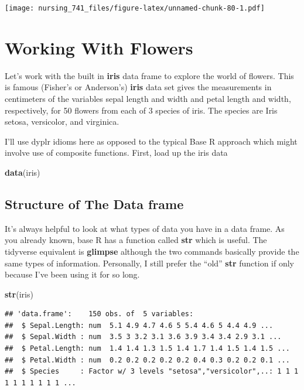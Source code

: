 \documentclass[]{book}
\newenvironment{Shaded}{\begin{snugshade}}{\end{snugshade}}
\newcommand{\KeywordTok}[1]{\textcolor[rgb]{0.13,0.29,0.53}{\textbf{#1}}}
\newcommand{\NormalTok}[1]{#1}
\begin{document}
\texttt{[image: nursing\_741\_files/figure-latex/unnamed-chunk-80-1.pdf]}

\hypertarget{working-with-flowers}{%
\section{Working With Flowers}\label{working-with-flowers}}

Let's work with the built in \textbf{iris} data frame to explore the world of flowers. This is famous (Fisher's or Anderson's) \textbf{iris} data set gives the measurements in centimeters of the variables sepal length and width and petal length and width, respectively, for 50 flowers from each of 3 species of iris. The species are Iris setosa, versicolor, and virginica.

I'll use dyplr idioms here as opposed to the typical Base R approach which might involve use of composite functions. First, load up the iris data

\begin{Shaded}
\begin{Highlighting}[]
\KeywordTok{data}\NormalTok{(iris)}
\end{Highlighting}
\end{Shaded}

\hypertarget{structure-of-the-data-frame}{%
\subsection{Structure of The Data frame}\label{structure-of-the-data-frame}}

It's always helpful to look at what types of data you have in a data frame. As you already known, base R has a function called \textbf{str} which is useful. The tidyverse equivalent is \textbf{glimpse} although the two commands basically provide the same types of information. Personally, I still prefer the ``old'' \textbf{str} function if only because I've been using it for so long.

\begin{Shaded}
\begin{Highlighting}[]
\KeywordTok{str}\NormalTok{(iris)}
\end{Highlighting}
\end{Shaded}

\begin{verbatim}
## 'data.frame':    150 obs. of  5 variables:
##  $ Sepal.Length: num  5.1 4.9 4.7 4.6 5 5.4 4.6 5 4.4 4.9 ...
##  $ Sepal.Width : num  3.5 3 3.2 3.1 3.6 3.9 3.4 3.4 2.9 3.1 ...
##  $ Petal.Length: num  1.4 1.4 1.3 1.5 1.4 1.7 1.4 1.5 1.4 1.5 ...
##  $ Petal.Width : num  0.2 0.2 0.2 0.2 0.2 0.4 0.3 0.2 0.2 0.1 ...
##  $ Species     : Factor w/ 3 levels "setosa","versicolor",..: 1 1 1 1 1 1 1 1 1 1 ...
\end{verbatim}
\end{document}

